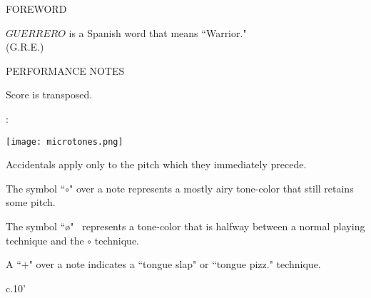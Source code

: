 \documentclass[10pt]{article}
\begin{document}
\begin{center}
\huge FOREWORD
\end{center}

\begin{center}
$GUERRERO$ is a Spanish word that means ``Warrior."\\
\phantom{text} \hfill (G.R.E.)
  \end{center}
  
\vspace*{0.2\baselineskip}

\begin{center}
\huge PERFORMANCE NOTES
\end{center}

\begin{center}
Score is transposed.
\end{center}

\begin{center}
:
\end{center}

\begin{center}
\texttt{[image: microtones.png]}
\end{center}

\begin{center}
Accidentals apply only to the pitch which they immediately precede.
\end{center}

\begin{center}
The symbol ``$\circ$" over a note represents a mostly airy tone-color that still retains some pitch.
\end{center}

\begin{center}
The symbol ``\o" \ represents a tone-color that is halfway between a normal playing technique and the $\circ$ technique.
\end{center}

\begin{center}
A ``$+$" over a note indicates a ``tongue slap" or ``tongue pizz." technique.
\end{center}

\vspace*{0.4\baselineskip}

\begin{center}
c.10'
\end{center}

\vspace*{0.3\baselineskip}
\end{document}
